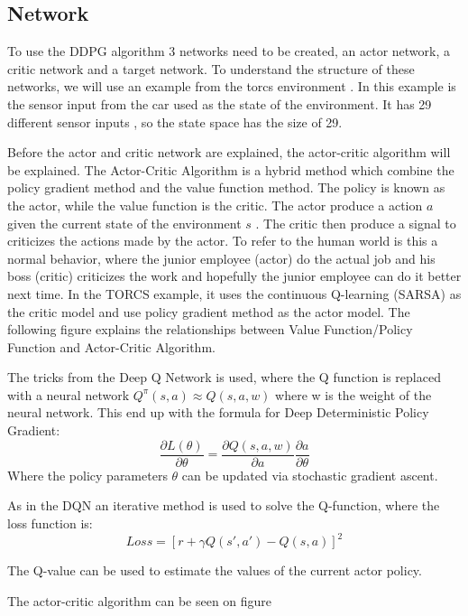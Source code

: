 \subsection{Network}
To use the DDPG algorithm 3 networks need to be created, an actor network, a critic network and a target network. To understand the structure of these networks, we will use an example from the torcs environment \cite{DDPG_Torcs}. In this example is the sensor input from the car used as the state of the environment. It has 29 different sensor inputs \cite{Data_from_Torcs}, so the state space has the size of 29. 

Before the actor and critic network are explained, the actor-critic algorithm will be explained. The Actor-Critic Algorithm is a hybrid method which combine the policy gradient method and the value function method. The policy is known as the actor, while the value function is the critic. The actor produce a action $a$ given the current state of the environment $s$ . The critic then produce a signal to criticizes the actions made by the actor. To refer to the human world is this a normal behavior, where the junior employee (actor) do the actual job and his boss (critic) criticizes the work and hopefully the junior employee can do it better next time. In the TORCS example, it uses the continuous Q-learning (SARSA) as the critic model and use policy gradient method as the actor model. The following figure explains the relationships between Value Function/Policy Function and Actor-Critic Algorithm.    

The tricks from the Deep Q Network is used, where the Q function is replaced with a neural network $Q^\pi(s,a) \approx Q(s,a,w)$ where w is the weight of the neural network. This end up with the formula for Deep Deterministic Policy Gradient:
\begin{equation}
\frac{\partial L(\theta)}{\partial \theta} =\frac{\partial Q(s,a,w)}{\partial a} \frac{\partial a}{\partial \theta}
\end{equation}
Where the policy parameters $\theta$ can be updated via stochastic gradient ascent.

As in the DQN an iterative method is used to solve the Q-function, where the loss function is:
\begin{equation}
Loss = [r + \gamma Q(s',a') - Q(s,a)]^2
\end{equation} 

The Q-value can be used to estimate the values of the current actor policy. 

The actor-critic algorithm can be seen on figure 

